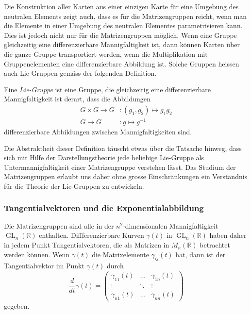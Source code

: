 Die Konstruktion aller Karten aus einer einzigen Karte für eine
Umgebung des neutralen Elements zeigt auch, dass es für die Matrizengruppen
reicht, wenn man die Elemente in einer Umgebung des neutralen
Elementes parametrisieren kann.
Dies ist jedoch nicht nur für die Matrizengruppen möglich.
Wenn eine Gruppe gleichzeitig eine differenzierbare Mannigfaltigkeit
ist, dann können Karten über die ganze Gruppe transportiert werden,
wenn die Multiplikation mit Gruppenelementen eine differenzierbare
Abbildung ist.
Solche Gruppen heissen auch Lie-Gruppen gemäss der folgenden Definition.

\begin{definition}
%
Eine {\em Lie-Gruppe} ist eine Gruppe, die gleichzeitig eine differenzierbare
Mannigfaltigkeit ist derart, dass die Abbildungen
\begin{align*}
G\times G \to G &: (g_1,g_2)\mapsto g_1g_2
\\
G\to G &: g \mapsto g^{-1}
\end{align*}
differenzierbare Abbildungen zwischen Mannigfaltigkeiten sind.
\end{definition}

Die Abstraktheit dieser Definition täuscht etwas über die 
Tatsache hinweg, dass sich mit Hilfe der Darstellungstheorie
jede beliebige Lie-Gruppe als Untermannigfaltigkeit einer 
Matrizengruppe verstehen lässt.
Das Studium der Matrizengruppen erlaubt uns daher ohne grosse
Einschränkungen ein Verständnis für die Theorie der Lie-Gruppen
zu entwickeln.

\subsubsection{Tangentialvektoren und die Exponentialabbildung}
Die Matrizengruppen sind alle in der
$n^2$-dimensionalen Mannigfaltigkeit $\operatorname{GL}_n(\mathbb{R})$
enthalten.
Diffferenzierbare Kurven $\gamma(t)$ in $\operatorname{GL}_n(\mathbb{R})$
haben daher in jedem Punkt Tangentialvektoren, die als Matrizen in
$M_n(\mathbb{R})$ betrachtet werden können.
Wenn $\gamma(t)$ die Matrixelemente $\gamma_{ij}(t)$ hat, dann ist der
Tangentialvektor im Punkt $\gamma(t)$ durch
\[
\frac{d}{dt}
\gamma(t)
=
\begin{pmatrix}
\dot{\gamma}_{11}(t)&\dots &\dot{\gamma}_{1n}(t)\\
\vdots              &\ddots&\vdots              \\
\dot{\gamma}_{n1}(t)&\dots &\dot{\gamma}_{nn}(t)
\end{pmatrix}
\]
gegeben.

